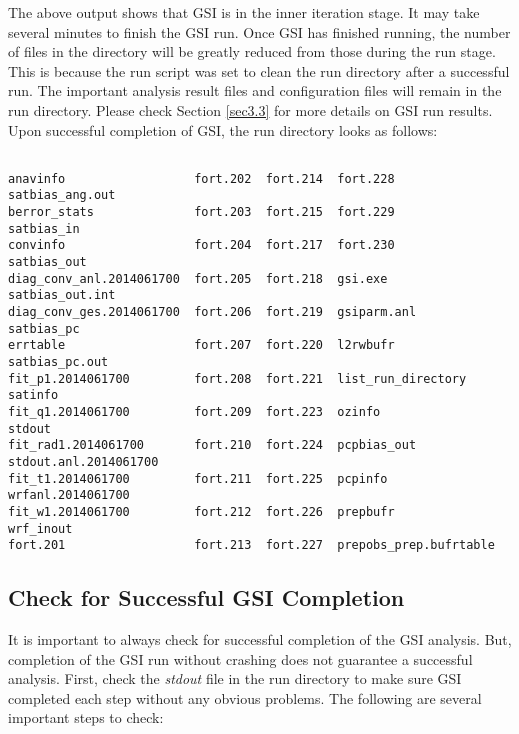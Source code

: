 The above output shows that GSI is in the inner iteration stage.  It may take several minutes to finish the GSI run.  Once GSI has finished running, the number of files in the directory will be greatly reduced from those during the run stage.  This is because the run script was set to clean the run directory after a successful run.  The important analysis result files and configuration files will remain in the run directory. Please check Section \ref{sec3.3} for more details on GSI run results. Upon successful completion of GSI, the run directory looks as follows:

\begin{scriptsize}
\begin{verbatim}

anavinfo                  fort.202  fort.214  fort.228                satbias_ang.out
berror_stats              fort.203  fort.215  fort.229                satbias_in
convinfo                  fort.204  fort.217  fort.230                satbias_out
diag_conv_anl.2014061700  fort.205  fort.218  gsi.exe                 satbias_out.int
diag_conv_ges.2014061700  fort.206  fort.219  gsiparm.anl             satbias_pc
errtable                  fort.207  fort.220  l2rwbufr                satbias_pc.out
fit_p1.2014061700         fort.208  fort.221  list_run_directory      satinfo
fit_q1.2014061700         fort.209  fort.223  ozinfo                  stdout
fit_rad1.2014061700       fort.210  fort.224  pcpbias_out             stdout.anl.2014061700
fit_t1.2014061700         fort.211  fort.225  pcpinfo                 wrfanl.2014061700
fit_w1.2014061700         fort.212  fort.226  prepbufr                wrf_inout
fort.201                  fort.213  fort.227  prepobs_prep.bufrtable
\end{verbatim}
\end{scriptsize}

\subsection{Check for Successful GSI Completion}
\label{sec5.1.3}

It is important to always check for successful completion of the GSI analysis. But, completion of the GSI run without crashing does not guarantee a successful analysis.  First, check the \textit{stdout} file in the run directory to make sure GSI completed each step without any obvious problems.  The following are several important steps to check:

